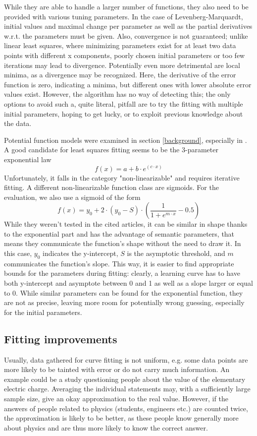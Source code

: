 While they are able to handle a larger number of functions, they also need to be provided with various tuning parameters. In the case of Levenberg-Marquardt, initial values and maximal change per parameter as well as the partial derivatives w.r.t. the parameters must be given. Also, convergence is not guaranteed; unlike linear least squares, where minimizing parameters exist for at least two data points with different x components, poorly chosen initial parameters or too few iterations may lead to divergence. Potentially even more detrimental are local minima, as a divergence may be recognized. Here, the derivative of the error function is zero, indicating a minima, but different ones with lower absolute error values exist. However, the algorithm has no way of detecting this; the only options to avoid such a, quite literal, pitfall are to try the fitting with multiple initial parameters, hoping to get lucky, or to exploit previous knowledge about the data.

Potential function models were examined in section \ref{background}, especially in \cite{Singh2005}. A good candidate for least squares fitting seems to be the 3-parameter exponential law
\begin{equation}
f(x) = a + b \cdot e^(c \cdot x)
\end{equation}
Unfortunately, it falls in the category "non-linearizable" and requires iterative fitting. A different non-linearizable function class are sigmoids. For the evaluation, we also use a sigmoid of the form
\begin{equation}
f(x) = y_0 + 2 \cdot (y_0 - S) \cdot \left( \frac{1}{1+e^{m \cdot x}} - 0.5 \right)
\end{equation}
While they weren't tested in the cited articles, it can be similar in shape thanks to the exponential part and has the advantage of semantic parameters, that means they communicate the function's shape without the need to draw it. In this case, $y_0$ indicates the y-intercept, $S$ is the asymptotic threshold, and $m$ communicates the function's slope. This way, it is easier to find appropriate bounds for the parameters during fitting: clearly, a learning curve has to have both y-intercept and asymptote between 0 and 1 as well as a slope larger or equal to 0. While similar parameters can be found for the exponential function, they are not as precise, leaving more room for potentially wrong guessing, especially for the initial parameters.

\subsection{Fitting improvements}
Usually, data gathered for curve fitting is not uniform, e.g. some data points are more likely to be tainted with error or do not carry much information. An example could be a study questioning people about the value of the elementary electric charge. Averaging the individual statements may, with a sufficiently large sample size, give an okay approximation to the real value. However, if the answers of people related to physics (students, engineers etc.) are counted twice, the approximation is likely to be better, as these people know generally more about physics and are thus more likely to know the correct answer.

